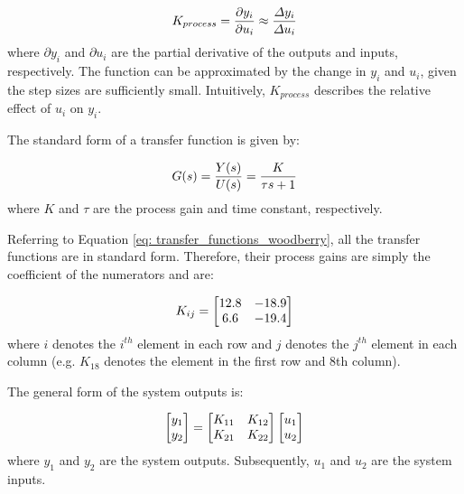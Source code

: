 \begin{equation}
    \centering
    K_{process} = \frac{\partial y_i}{\partial u_i} \approx \frac{\varDelta y_i}{\varDelta u_i}
    \label{eq: process_gain}
\end{equation}
where $\partial y_i$ and $\partial u_i$ are the partial derivative of the outputs and inputs, respectively. The function can be approximated by the change in $y_i$ and $u_i$, given the step sizes are sufficiently small.  Intuitively, $K_{process}$ describes the relative effect of $u_i$ on $y_i$.  

The standard form of a transfer function is given by:

\begin{equation}
    \centering
    G(s) = \frac{Y(s)}{U(s)} = \frac{K}{\tau s + 1}
\end{equation}
where $K$ and $\tau$ are the process gain and time constant, respectively.

Referring to Equation \ref{eq: transfer_functions_woodberry}, all the transfer functions are in standard form.  Therefore, their process gains are simply the coefficient of the numerators and are:

\begin{equation}
    \centering
    K_{ij} =
    \begin{bmatrix}
    12.8     &     -18.9 \\
    6.6      &     -19.4 
    \end{bmatrix}
    \label{eq: process_gains}
\end{equation}
where $i$ denotes the $i^{th}$ element in each row and $j$ denotes the $j^{th}$ element in each column (e.g. $K_{18}$ denotes the element in the first row and 8th column).

The general form of the system outputs is:

\begin{equation}
    \centering
    \begin{bmatrix}
        y_1 \\
        y_2
    \end{bmatrix}
    =
    \begin{bmatrix}
        K_{11}  &  K_{12} \\
        K_{21}  &  K_{22}
    \end{bmatrix}
    \begin{bmatrix}
        u_1 \\
        u_2
    \end{bmatrix}
    \label{eq: general_ss_form}
\end{equation}
where $y_1$ and $y_2$ are the system outputs.  Subsequently, $u_1$ and $u_2$ are the system inputs. \\

